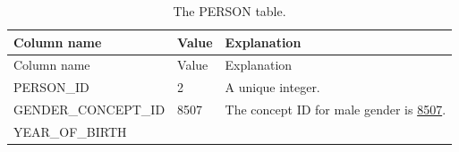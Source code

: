 \documentclass[11pt]{book}
\theoremstyle{definition}
\theoremstyle{definition}
\theoremstyle{definition}
\theoremstyle{remark}
\begin{document}
\begin{longtable}[]{@{}lll@{}}
\caption{\label{tab:johnPerson} The PERSON table.}\tabularnewline
\toprule
\begin{minipage}[b]{0.28\columnwidth}\raggedright\strut
Column name\strut
\end{minipage} & \begin{minipage}[b]{0.16\columnwidth}\raggedright\strut
Value\strut
\end{minipage} & \begin{minipage}[b]{0.48\columnwidth}\raggedright\strut
Explanation\strut
\end{minipage}\tabularnewline
\midrule
\endfirsthead
\toprule
\begin{minipage}[b]{0.28\columnwidth}\raggedright\strut
Column name\strut
\end{minipage} & \begin{minipage}[b]{0.16\columnwidth}\raggedright\strut
Value\strut
\end{minipage} & \begin{minipage}[b]{0.48\columnwidth}\raggedright\strut
Explanation\strut
\end{minipage}\tabularnewline
\midrule
\endhead
\begin{minipage}[t]{0.28\columnwidth}\raggedright\strut
PERSON\_ID\strut
\end{minipage} & \begin{minipage}[t]{0.16\columnwidth}\raggedright\strut
2\strut
\end{minipage} & \begin{minipage}[t]{0.48\columnwidth}\raggedright\strut
A unique integer.\strut
\end{minipage}\tabularnewline
\begin{minipage}[t]{0.28\columnwidth}\raggedright\strut
GENDER\_CONCEPT\_ID\strut
\end{minipage} & \begin{minipage}[t]{0.16\columnwidth}\raggedright\strut
8507\strut
\end{minipage} & \begin{minipage}[t]{0.48\columnwidth}\raggedright\strut
The concept ID for male gender is
\href{http://athena.ohdsi.org/search-terms/terms/8507}{8507}.\strut
\end{minipage}\tabularnewline
\begin{minipage}[t]{0.28\columnwidth}\raggedright\strut
YEAR\_OF\_BIRTH\strut
\end{minipage} & \begin{minipage}[t]{0.16\columnwidth}\raggedright\strut

\end{minipage}
\end{longtable}
\end{document}
